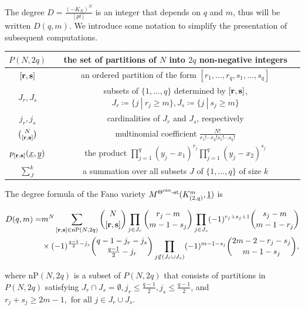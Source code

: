 \documentclass[11pt]{article}
\begin{document}
The degree \(D = \frac{(-K_X)^N}{[pt]}\) is an integer that depends on \(q\) and \(m\), thus will be written \(D(q, m)\). We introduce some notation to simplify the presentation of subsequent computations.

\begin{table}[H]
    \centering
    {
        \renewcommand{\arraystretch}{1.6}
        \begin{tabular}{|c|c|}
            \hline 
            \(P(N, 2q)\) & the set of partitions of \(N\) into \(2q\) non-negative integers\\ 
            \hline
            \(\boldpartitions{r}{s}\) & an ordered partition of the form \([r_1, \dots, r_q, s_1, \dots, s_q]\)\\ 
            \hline
            \(J_r, J_s\) & \makecell{subsets of \(\{1, \dots, q\}\) determined by \(\boldpartitions{r}{s}\), \\ \(J_r \coloneqq \{j~|~r_j\geq m\}, J_s \coloneqq \{j~|~s_j\geq m\}\)}\\ 
            \hline
            \(j_r, j_s\) & cardinalities of \(J_r\) and \(J_s\), respectively \\ 
            \hline
            \(\binom{N}{[\mathbf{r}, \mathbf{s}]}\) & multinomial coefficient \(\frac{N!}{r_1!\cdots r_q!s_1!\cdots s_q!}\)\\ 
            \hline 
            \(p_{[\mathbf{r}, \mathbf{s}]}(\underline{x}, \underline{y})\) & the product \(\prod_{j = 1}^q(y_j - x_1)^{r_j}\prod_{j = 1}^q(y_j - x_2)^{s_j}\)\\
            \hline
            \(\displaystyle \sum_{J}^{k}\) & a summation over all subsets \(J\) of \(\{1, \dots, q\}\) of size \(k\)\\ 
            \hline 
        \end{tabular}
    }
\end{table}

\begin{proposition}\label{Proposition:k2qm-deg}
    The degree formula of the Fano variety \(M^{\Theta^{\text{can}}\text{-st}}(K_{(2,q)}^m, \underline{1})\) is 

    \begin{align}
        D(q,m) =& m^{N}\sum_{[\mathbf{r}, \mathbf{s}]\in \mathrm{nP}(N, 2q)}\binom{N}{[\mathbf{r}, \mathbf{s}]}\prod_{j\in J_r}\binom{r_j - m}{m-1-s_j}\prod_{j\in J_s}(-1)^{r_j + s_j + 1}\binom{s_j - m}{m-1-r_j}\notag\\ 
        &\times(-1)^{\frac{q-1}{2}-j_s}\binom{q-1-j_r-j_s}{\frac{q-1}{2}-j_r}\prod_{j\notin (J_r\cup J_s)}(-1)^{m-1-s_j}\binom{2m-2-r_j-s_j}{m-1-s_j},
    \end{align}

    where \(\mathrm{nP}(N, 2q)\) is a subset of \(P(N, 2q)\) that consists of partitions in \(P(N, 2q)\) satisfying \(J_r\cap J_s = \emptyset, j_r\leq\frac{q-1}{2},j_s\leq\frac{q-1}{2}\), and \(r_j + s_j\geq 2m-1, \text{ for all } j\in J_r\cup J_s\). 
\end{proposition}
\end{document}
